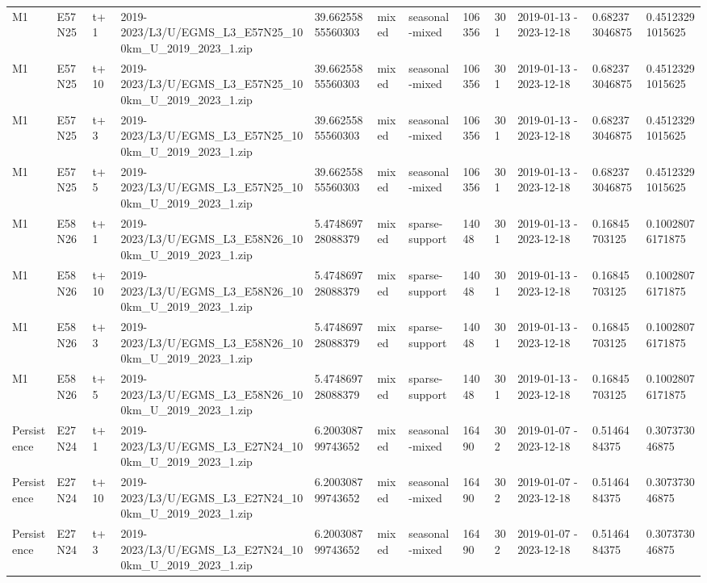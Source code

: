 \begin{landscape}
\begin{longtable}{llllllllllll}
M1 & E57N25 & t+1 & 2019-2023/L3/U/EGMS\_L3\_E57N25\_100km\_U\_2019\_2023\_1.zip & 39.66255855560303 & mixed & seasonal-mixed & 106356 & 301 & 2019-01-13 - 2023-12-18 & 0.682373046875 & 0.45123291015625 \\
M1 & E57N25 & t+10 & 2019-2023/L3/U/EGMS\_L3\_E57N25\_100km\_U\_2019\_2023\_1.zip & 39.66255855560303 & mixed & seasonal-mixed & 106356 & 301 & 2019-01-13 - 2023-12-18 & 0.682373046875 & 0.45123291015625 \\
M1 & E57N25 & t+3 & 2019-2023/L3/U/EGMS\_L3\_E57N25\_100km\_U\_2019\_2023\_1.zip & 39.66255855560303 & mixed & seasonal-mixed & 106356 & 301 & 2019-01-13 - 2023-12-18 & 0.682373046875 & 0.45123291015625 \\
M1 & E57N25 & t+5 & 2019-2023/L3/U/EGMS\_L3\_E57N25\_100km\_U\_2019\_2023\_1.zip & 39.66255855560303 & mixed & seasonal-mixed & 106356 & 301 & 2019-01-13 - 2023-12-18 & 0.682373046875 & 0.45123291015625 \\
M1 & E58N26 & t+1 & 2019-2023/L3/U/EGMS\_L3\_E58N26\_100km\_U\_2019\_2023\_1.zip & 5.474869728088379 & mixed & sparse-support & 14048 & 301 & 2019-01-13 - 2023-12-18 & 0.16845703125 & 0.10028076171875 \\
M1 & E58N26 & t+10 & 2019-2023/L3/U/EGMS\_L3\_E58N26\_100km\_U\_2019\_2023\_1.zip & 5.474869728088379 & mixed & sparse-support & 14048 & 301 & 2019-01-13 - 2023-12-18 & 0.16845703125 & 0.10028076171875 \\
M1 & E58N26 & t+3 & 2019-2023/L3/U/EGMS\_L3\_E58N26\_100km\_U\_2019\_2023\_1.zip & 5.474869728088379 & mixed & sparse-support & 14048 & 301 & 2019-01-13 - 2023-12-18 & 0.16845703125 & 0.10028076171875 \\
M1 & E58N26 & t+5 & 2019-2023/L3/U/EGMS\_L3\_E58N26\_100km\_U\_2019\_2023\_1.zip & 5.474869728088379 & mixed & sparse-support & 14048 & 301 & 2019-01-13 - 2023-12-18 & 0.16845703125 & 0.10028076171875 \\
Persistence & E27N24 & t+1 & 2019-2023/L3/U/EGMS\_L3\_E27N24\_100km\_U\_2019\_2023\_1.zip & 6.200308799743652 & mixed & seasonal-mixed & 16490 & 302 & 2019-01-07 - 2023-12-18 & 0.5146484375 & 0.307373046875 \\
Persistence & E27N24 & t+10 & 2019-2023/L3/U/EGMS\_L3\_E27N24\_100km\_U\_2019\_2023\_1.zip & 6.200308799743652 & mixed & seasonal-mixed & 16490 & 302 & 2019-01-07 - 2023-12-18 & 0.5146484375 & 0.307373046875 \\
Persistence & E27N24 & t+3 & 2019-2023/L3/U/EGMS\_L3\_E27N24\_100km\_U\_2019\_2023\_1.zip & 6.200308799743652 & mixed & seasonal-mixed & 16490 & 302 & 2019-01-07 - 2023-12-18 & 0.5146484375 & 0.307373046875 \\

\end{longtable}
\end{landscape}
